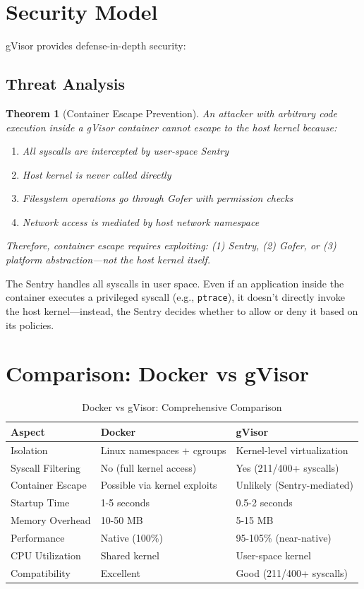\documentclass[12pt,twoside,openright]{book}
\theoremstyle{plain}
\newtheorem{theorem}{Theorem}[chapter]
\theoremstyle{definition}
\theoremstyle{remark}
\begin{document}
\section{Security Model}

gVisor provides defense-in-depth security:

\subsection{Threat Analysis}

\begin{theorem}[Container Escape Prevention]
An attacker with arbitrary code execution inside a gVisor container cannot escape to the host kernel because:
\begin{enumerate}
  \item All syscalls are intercepted by user-space Sentry
  \item Host kernel is never called directly
  \item Filesystem operations go through Gofer with permission checks
  \item Network access is mediated by host network namespace
\end{enumerate}
Therefore, container escape requires exploiting: (1) Sentry, (2) Gofer, or (3) platform abstraction—not the host kernel itself.
\end{theorem}

\proof
The Sentry handles all syscalls in user space. Even if an application inside the container executes a privileged syscall (e.g., \texttt{ptrace}), it doesn't directly invoke the host kernel—instead, the Sentry decides whether to allow or deny it based on its policies.
\endproof

\section{Comparison: Docker vs gVisor}

\begin{table}[H]
\centering
\small
\begin{tabular}{|p{2cm}|p{2.8cm}|p{2.8cm}|}
\hline
\textbf{Aspect} & \textbf{Docker} & \textbf{gVisor} \\
\hline
Isolation & Linux namespaces + cgroups & Kernel-level virtualization \\
\hline
Syscall Filtering & No (full kernel access) & Yes (211/400+ syscalls) \\
\hline
Container Escape & Possible via kernel exploits & Unlikely (Sentry-mediated) \\
\hline
Startup Time & 1-5 seconds & 0.5-2 seconds \\
\hline
Memory Overhead & 10-50 MB & 5-15 MB \\
\hline
Performance & Native (100\%) & 95-105\% (near-native) \\
\hline
CPU Utilization & Shared kernel & User-space kernel \\
\hline
Compatibility & Excellent & Good (211/400+ syscalls) \\
\hline
\hline
\end{tabular}
\caption{Docker vs gVisor: Comprehensive Comparison}
\label{tab:docker_vs_gvisor}
\end{table}
\end{document}
